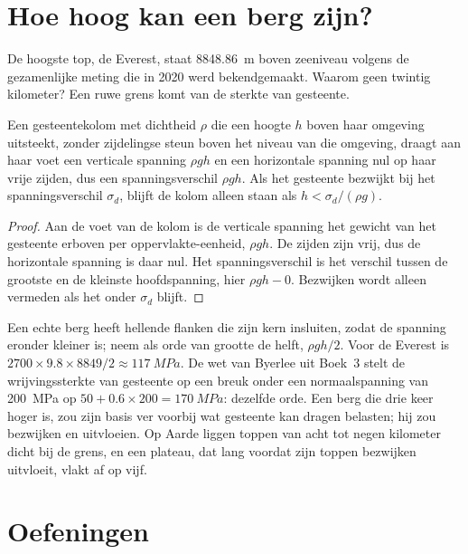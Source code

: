 \section{Hoe hoog kan een berg zijn?}\label{sec:b2:himalaya-andes:heights}

De hoogste top, de Everest, staat \qty{8848.86}{m} boven zeeniveau volgens de gezamenlijke meting
die in 2020 werd bekendgemaakt. Waarom geen twintig kilometer? Een ruwe grens komt van de sterkte van gesteente.

\begin{proposition}\label{prop:b2:himalaya-andes:height}
Een gesteentekolom met dichtheid $\rho$ die een hoogte $h$ boven haar omgeving uitsteekt, zonder
zijdelingse steun boven het niveau van die omgeving, draagt aan haar voet een verticale spanning $\rho g h$ en een
horizontale spanning nul op haar vrije zijden, dus een spanningsverschil $\rho g h$. Als het
gesteente bezwijkt bij het spanningsverschil $\sigma_d$, blijft de kolom alleen staan als $h < \sigma_d/(\rho
g)$.
\end{proposition}

\begin{proof}
Aan de voet van de kolom is de verticale spanning het gewicht van het gesteente erboven per oppervlakte-eenheid,
$\rho g h$. De zijden zijn vrij, dus de horizontale spanning is daar nul. Het
spanningsverschil is het verschil tussen de grootste en de kleinste hoofdspanning, hier $\rho g h - 0$.
Bezwijken wordt alleen vermeden als het onder $\sigma_d$ blijft.
\end{proof}

Een echte berg heeft hellende flanken die zijn kern insluiten, zodat de spanning eronder
kleiner is; neem als orde van grootte de helft, $\rho g h/2$. Voor de Everest is $2700 \times 9.8
\times 8849/2 \approx \qty{117}{MPa}$. De wet van Byerlee uit Boek~3 stelt de
wrijvingssterkte van gesteente op een breuk onder een normaalspanning van \qty{200}{MPa} op $50 + 0.6 \times 200 =
\qty{170}{MPa}$: dezelfde orde. Een berg die drie keer hoger is, zou zijn basis ver voorbij
wat gesteente kan dragen belasten; hij zou bezwijken en uitvloeien. Op Aarde liggen toppen van acht tot negen kilometer
dicht bij de grens, en een plateau, dat lang voordat zijn toppen bezwijken uitvloeit, vlakt af
op vijf.

\section*{Oefeningen}\label{sec:b2:himalaya-andes:exercises}

